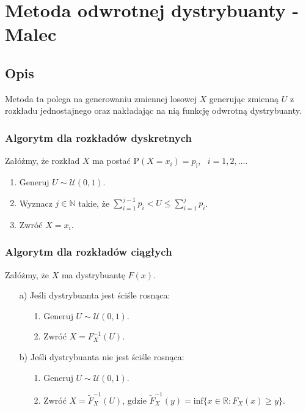 \documentclass[12pt]{mwrep}
\begin{document}
	
	\section{Metoda odwrotnej dystrybuanty - Malec}
	
	\subsection{Opis}
	\noindent Metoda ta polega na generowaniu zmiennej losowej $X$ generując zmienną $U$ z rozkładu jednostajnego oraz nakładając na nią funkcję odwrotną dystrybuanty.
	\subsubsection{Algorytm dla rozkładów dyskretnych}
	\noindent Załóżmy, że rozkład $X$ ma postać $\mathrm{P}(X = x_i) = p_\mathrm{i}$, \ $i = 1, 2,\dots $.
	\begin{enumerate}[leftmargin=10mm]
		\item Generuj $U \sim \mathcal{U}(0, 1)$.
		\item Wyznacz $j \in \mathbb{N} $ takie, że $ \sum\limits_{i=1}^{j-1} p_i < U \leqslant \sum\limits_{i=1}^{j} p_i $.
		\item Zwróć $ X = x_i $.
	\end{enumerate}
	\subsubsection{Algorytm dla rozkładów ciągłych}
	\noindent Załóżmy, że $X$ ma dystrybuantę $F(x)$.
	\begin{enumerate}
		\item[a)] Jeśli dystrybuanta jest ściśle rosnąca:
		\begin{enumerate}
			\item[1.] Generuj $U \sim \mathcal{U}(0, 1)$.
			\item[2.] Zwróć $ X = F_X^{-1}(U) $.
		\end{enumerate}
		\item[b)] Jeśli dystrybuanta nie jest ściśle rosnąca:
		\begin{enumerate}
			\item[1.] Generuj $U \sim \mathcal{U}(0, 1)$.
			\item[2.] Zwróć $ X = \widetilde{F}_X^{-1}(U) $, gdzie $ \widetilde{F}_X^{-1}(y) = \mathrm{inf}\{x \in \mathbb{R}: F_X(x) \geqslant y\} $.
		\end{enumerate}
	\end{enumerate}
\end{document}
